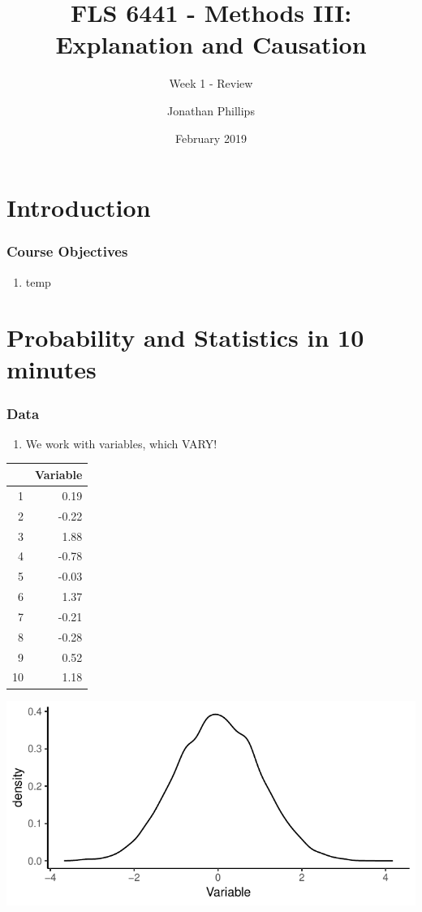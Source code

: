 \documentclass[xcolor=x11names,compress]{beamer}\usepackage[]{graphicx}\usepackage[]{color}
\title{FLS 6441 - Methods III: Explanation and Causation}
\subtitle{Week 1 - Review}
\author{Jonathan Phillips}
\date{February 2019}
\makeatletter
\def\maxwidth{ %
  \ifdim\Gin@nat@width>\linewidth
    \linewidth
  \else
    \Gin@nat@width
  \fi
}
\newenvironment{knitrout}{}{} %
\renewcommand{\(}{\begin{columns}}
\renewcommand{\)}{\end{columns}}
\newcommand{\<}[1]{\begin{column}{#1}}
\renewcommand{\>}{\end{column}}
\makeatother
\begin{document}
\frame{\titlepage}

\section{Introduction}

\begin{frame}
\frametitle{Course Objectives}
\begin{enumerate}
\item temp
\end{enumerate}
\end{frame}

\section{Probability and Statistics in 10 minutes}

\begin{frame}
\frametitle{Data}
\begin{enumerate}
\item We work with variables, which VARY!
\end{enumerate}
\begin{multicols}{2}
\begin{table}[ht]
\centering
\begin{tabular}{rr}
  \hline
 & Variable \\ 
  \hline
1 & 0.19 \\ 
  2 & -0.22 \\ 
  3 & 1.88 \\ 
  4 & -0.78 \\ 
  5 & -0.03 \\ 
  6 & 1.37 \\ 
  7 & -0.21 \\ 
  8 & -0.28 \\ 
  9 & 0.52 \\ 
  10 & 1.18 \\ 
   \hline
\end{tabular}
\end{table}

\columnbreak
\begin{knitrout}
\color{fgcolor}
\includegraphics[width=\maxwidth]{figure/var2-1} 

\end{knitrout}
\end{multicols}
\end{frame}
\end{document}
